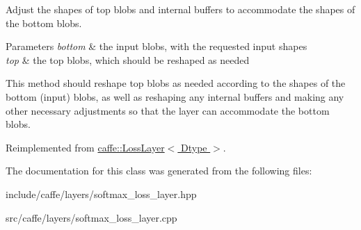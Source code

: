 Adjust the shapes of top blobs and internal buffers to accommodate the shapes of the bottom blobs. 


\begin{DoxyParams}{Parameters}
{\em bottom} & the input blobs, with the requested input shapes \\
\hline
{\em top} & the top blobs, which should be reshaped as needed\\
\hline
\end{DoxyParams}
This method should reshape top blobs as needed according to the shapes of the bottom (input) blobs, as well as reshaping any internal buffers and making any other necessary adjustments so that the layer can accommodate the bottom blobs. 

Reimplemented from \hyperlink{classcaffe_1_1LossLayer_ab15b7120ebc172274481f3732db78c9e}{caffe\+::\+Loss\+Layer$<$ Dtype $>$}.



The documentation for this class was generated from the following files\+:\begin{DoxyCompactItemize}
\item 
include/caffe/layers/softmax\+\_\+loss\+\_\+layer.\+hpp\item 
src/caffe/layers/softmax\+\_\+loss\+\_\+layer.\+cpp\end{DoxyCompactItemize}
